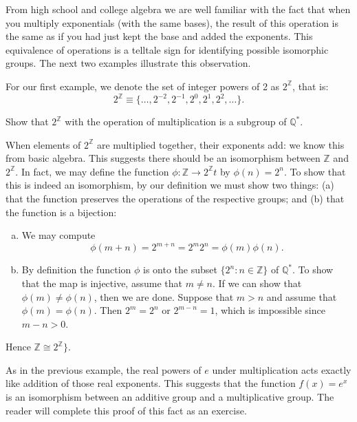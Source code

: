 From high school and college algebra we are well familiar with the fact that when you multiply exponentials (with the same bases), the result of this operation is the same as if you had just kept the base and added the exponents.  This equivalence of operations is a telltale sign for identifying possible isomorphic groups.  The next two examples illustrate this observation.

For our first example, we   denote the set of integer powers of 2 as $2^{\mathbb Z}$, that is:
\[ 2^{\mathbb Z} \equiv \{\ldots, 2^{-2}, 2^{-1}, 2^0, 2^1, 2^2, \ldots\}. \]
\begin{exercise}
Show that $2^{\mathbb Z}$ with the operation of multiplication is a subgroup of ${\mathbb Q}^{\ast}$.
\end{exercise}

\begin{example}\label{example:isomorph:rational_isomorph}
When elements of $2^{\mathbb Z}$ are multiplied together, their exponents add: we know this from basic algebra. This suggests there should be an isomorphism between ${\mathbb Z}$ and   $2^{\mathbb Z}$. In fact, we may define the function
$\phi: {\mathbb Z} \rightarrow 2^{\mathbb Z}t$ by $\phi( n ) = 2^n$.
To show that this is indeed an isomorphism, by our definition we must show two things: (a)  that the function preserves the operations of the respective groups; and (b) that the function is a bijection:
\begin{enumerate}[(a)] 
\item
We may compute
\[
\phi( m + n ) = 2^{m + n} = 2^m 2^n = \phi( m ) \phi( n ).
\]
\item
By definition the function $\phi$ is onto the subset $\{2^n :n \in {\mathbb Z} \}$ of  ${\mathbb Q}^\ast$.  To show that the map is injective, assume that $m \neq n$.  If we can show that $\phi(m) \neq \phi(n)$, then we are done.  Suppose that $m>n$ and assume that $\phi(m) = \phi(n)$.  Then $2^m = 2^n$ or $2^{m-n} = 1$, which is impossible since $m-n>0$. 
\end{enumerate}

Hence $ {\mathbb Z} \cong 2^{\mathbb Z} \}$.
\end{example}      

 
\begin{example}\label{example:isomorph:RealIsomorph}
As in the previous example, the real powers of $e$ under multiplication acts exactly like addition of those real exponents.  
This suggests that the function $f(x)=e^x$ is an isomorphism between an additive group and a multiplicative group.  The reader will complete this proof of this fact as an exercise.  
\end{example}

